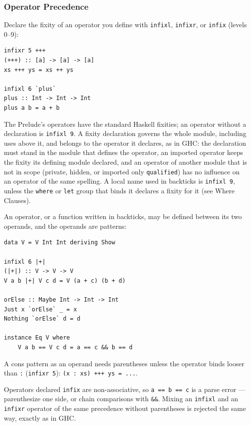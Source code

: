 \documentclass[11pt,a4paper]{article}
\begin{document}
\subsubsection{Operator Precedence}

Declare the fixity of an operator you define with \texttt{infixl},
\texttt{infixr}, or \texttt{infix} (levels 0--9):

\begin{lstlisting}
infixr 5 +++
(+++) :: [a] -> [a] -> [a]
xs +++ ys = xs ++ ys

infixl 6 `plus`
plus :: Int -> Int -> Int
plus a b = a + b
\end{lstlisting}

The Prelude's operators have the standard Haskell fixities; an operator
without a declaration is \texttt{infixl 9}. A fixity declaration governs
the whole module, including uses above it, and belongs to the operator it
declares, as in GHC: the declaration must stand in the module that defines
the operator, an imported operator keeps the fixity its defining module
declared, and an operator of another module that is not in scope (private,
hidden, or imported only \texttt{qualified}) has no influence on an
operator of the same spelling. A local name used in backticks is
\texttt{infixl 9}, unless the \texttt{where} or \texttt{let} group that
binds it declares a fixity for it (see Where Clauses).

An operator, or a function written in backticks, may be defined between
its two operands, and the operands are patterns:

\begin{lstlisting}
data V = V Int Int deriving Show

infixl 6 |+|
(|+|) :: V -> V -> V
V a b |+| V c d = V (a + c) (b + d)

orElse :: Maybe Int -> Int -> Int
Just x `orElse` _ = x
Nothing `orElse` d = d

instance Eq V where
    V a b == V c d = a == c && b == d
\end{lstlisting}

A cons pattern as an operand needs parentheses unless the operator binds
looser than \texttt{:} (\texttt{infixr 5}): \texttt{(x : xs) +++ ys = ...}.

Operators declared \texttt{infix} are non-associative, so \texttt{a == b == c}
is a parse error --- parenthesize one side, or chain comparisons with
\texttt{\&\&}. Mixing an \texttt{infixl} and an \texttt{infixr} operator of the
same precedence without parentheses is rejected the same way, exactly as in
GHC.
\end{document}
